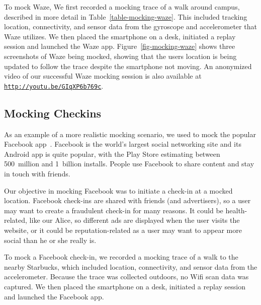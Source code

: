To mock Waze, We first recorded a mocking trace of a walk around campus,
described in more detail in Table~\ref{table-mocking-waze}.  This included
tracking location, connectivity, and sensor data from the gyroscope and
accelerometer that Waze utilizes. We then placed the smartphone on a desk,
initiated a replay session and launched the Waze app.
Figure~\ref{fig-mocking-waze} shows three screenshots of Waze being mocked,
showing that the users location is being updated to follow the trace despite
the smartphone not moving. An anonymized video of our successful Waze mocking
session is also available at
\hyperlink{http://youtu.be/GIqXP6b769c}{\texttt{http://youtu.be/GIqXP6b769c}}.

\subsection{Mocking Checkins}

As an example of a more realistic mocking scenario, we used \PocketMocker{}
to mock the popular Facebook app~\cite{facebook-playstore-url}. Facebook is
the world's largest social networking site and its Android app is quite
popular, with the Play Store estimating between 500~million and 1~billion
installs. People use Facebook to share content and stay in touch with
friends.

Our objective in mocking Facebook was to initiate a check-in at a mocked
location. Facebook check-ins are shared with friends (and advertisers), so a
user may want to create a fraudulent check-in for many reasons. It could be
health-related, like our Alice, so different ads are displayed when the user
visits the website, or it could be reputation-related as a user may want to
appear more social than he or she really is.

To mock a Facebook check-in, we recorded a mocking trace of a walk to the
nearby Starbucks, which included location, connectivity, and sensor data from
the accelerometer. Because the trace was collected outdoors, no Wifi scan
data was captured. We then placed the smartphone on a desk, initiated a
replay session and launched the Facebook app.

